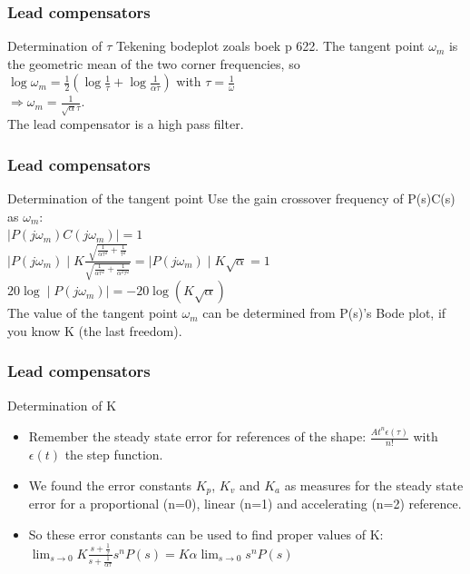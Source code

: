 \begin{frame}
\frametitle{Lead compensators}
\begin{block}{Determination of $\tau$}
	Tekening bodeplot zoals boek p 622.
	The tangent point $\omega_m$ is the geometric mean of the two corner frequencies, so
	$ \log \omega_m = \frac{1}{2}(\log \frac{1}{\tau} + \log \frac{1}{\alpha\tau})$ with $\tau = \frac{1}{\omega}$
	\\ $\Rightarrow \omega_m = \frac{1}{\sqrt{\alpha}\tau}$. \\
	The lead compensator is a high pass filter.
\end{block}
\end{frame}

\begin{frame}
\frametitle{Lead compensators}
\begin{block}{Determination of the tangent point}
	Use the gain crossover frequency of P(s)C(s) as $\omega_m$: \\
	$\mid P(j\omega_m)C(j\omega_m) \mid = 1$ \\
	$\mid P(j\omega_m) \mid K \frac{\sqrt{\frac{1}{\alpha\tau^2} + \frac{1}{\tau^2}}}{\sqrt{\frac{1}{\alpha\tau^2} + \frac{1}{\alpha^2\tau^2}}} = \mid P(j\omega_m) \mid K \sqrt{\alpha} = 1$ \\
	$20\log \mid P(j\omega_m) \mid = -20\log (K\sqrt{\alpha})$ \\
	The value of the tangent point $\omega_m$ can be determined from P(s)'s Bode plot, if you know K (the last freedom).
\end{block}
\end{frame}	

\begin{frame}
\frametitle{Lead compensators}
\begin{block}{Determination of K}
	\begin{itemize}
		\item Remember the steady state error for references of the shape: $\frac{At^n\epsilon(\tau)}{n!}$ with $\epsilon(t)$ the step function.
		\item We found the error constants $K_p$, $K_v$ and $K_a$ as measures for the steady state error for a proportional (n=0), linear (n=1) and accelerating (n=2) reference.
		\item So these error constants can be used to find proper values of K: 
		$\lim_{s \to 0} K \frac{s + \frac{1}{\tau}}{s + \frac{1}{\alpha\tau}}s^nP(s) = K\alpha \lim_{s \to 0}s^nP(s)$
	\end{itemize}
\end{block}
\end{frame}

